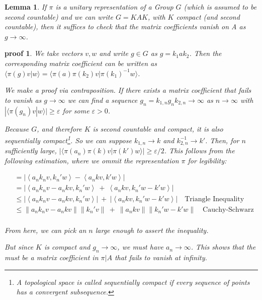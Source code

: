 \documentclass[
  12pt
]{article}
\theoremstyle{break}
\theoremstyle{plain}
\newtheorem{lem}[thm]{Lemma}
\newtheorem*{pf}{proof}
\newcommand{\abs}[1]{| #1 |}
\newcommand{\inn}[1]{\left\langle #1 \right\rangle}
\newcommand{\norm}[1]{\lVert #1 \rVert}
\begin{document}
  \begin{lem}
    \label{lemma}
    If $\pi$ is a unitary representation of a Group $G$ (which is assumed to be second countable) and we can write $G =
    KAK$, with $K$ compact (and second countable), then it suffices to check that the matrix
    coefficients vanish on A as $g \rightarrow \infty$.
  \end{lem}

  \begin{pf}
    \label{pf:lemma}
    We take vectors $v, w$ and write $g \in G$ as $g = k_1 a k_2$.
    Then the corresponding matrix
    coefficient can be written as $\langle \pi(g)v|w \rangle = \langle \pi(a) \pi(k_2) v | \pi(k_1)^{-1} w \rangle$.

    We make a proof via contraposition.
    If there exists a matrix coefficient that fails to vanish as $g \rightarrow \infty$
    we can find a sequence $g_n = k_{1,n} g_{n} k_{2,n} \rightarrow \infty$ as
    $n \rightarrow \infty$ with
    $|\langle \pi(g_n) v | w \rangle | \geq \varepsilon$ for some $\varepsilon > 0$.

    Because $G$, and therefore $K$ is second countable and compact, it is also sequentially compact\footnote{A topological space is called \emph{sequentially compact} if every sequence of points has a convergent subsequence.}.
    So we can suppose $k_{1,n} \rightarrow k$ and $k_{2,n}^{-1} \rightarrow k'$.
    Then, for $n$ sufficiently large, $|\langle \pi(a_n)\pi(k)v | \pi(k') w \rangle | \geq \varepsilon/2$.
    This follows from the following estimation, where we ommit the representation $\pi$ for legibility:

    \begin{align*}
        &=\abs{\inn{a_n k_n v, k_n' w} - \inn{a_n k v, k' w}} \\
        &= \abs{\inn{a_nk_nv - a_nkv, k_n'w} \ + \ \inn{a_nkv, k_n'w - k'w}}  \\
        &\leq \abs{\inn{a_nk_nv - a_nkv, k_n'w}} \ + \ \abs{\inn{a_nkv, k_n'w - k'w}} \quad \text{Triangle Inequality} \\
        &\leq \norm{a_nk_nv - a_nkv}\norm{k_n'v} \ + \ \norm{a_nkv}\norm{k_n'w - k'w} \quad \text{Cauchy-Schwarz} \\
     \end{align*}

    From here, we can pick an $n$ large enough to assert the inequality.

    But since $K$ is compact and $g_n \rightarrow \infty$, we must have
    $a_n \rightarrow \infty$. This shows that the must be a matrix
    coefficient in $\pi | A$ that fails to vanish at infinity.
  \end{pf}
\end{document}
